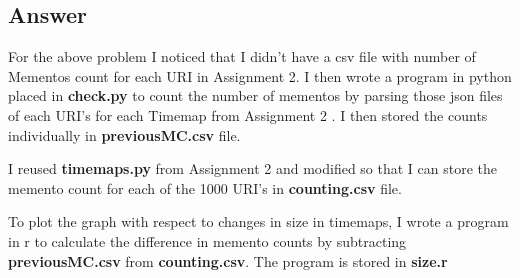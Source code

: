 \documentclass[letterpaper,11pt]{article}
\begin{document}
\subsection*{Answer}

For the above problem I noticed that I didn’t have a csv file with number of Mementos  count for each URI in Assignment 2. I then wrote a program in python placed in \textbf{check.py} to count the number of mementos by parsing those json files of each URI’s for each Timemap from Assignment 2 \cite{gittingref}. I then stored the counts individually in\textbf{ previousMC.csv} file.



I reused \textbf{timemaps.py} from Assignment 2 and modified so that I can store the memento count for each of the 1000 URI’s in \textbf{counting.csv} file.



To plot the graph with respect to changes in size in timemaps, I wrote a program in r to calculate the difference in memento counts by subtracting \textbf{previousMC.csv} from \textbf{counting.csv}. The program is stored in \textbf{size.r}



\end{document}
